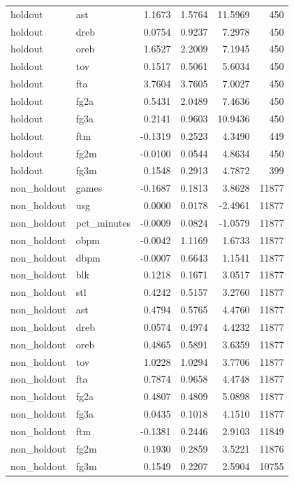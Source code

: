 \begin{table}
\begin{tabular}{llrrrr}
holdout & ast & 1.1673 & 1.5764 & 11.5969 & 450 \\
holdout & dreb & 0.0754 & 0.9237 & 7.2978 & 450 \\
holdout & oreb & 1.6527 & 2.2009 & 7.1945 & 450 \\
holdout & tov & 0.1517 & 0.5061 & 5.6034 & 450 \\
holdout & fta & 3.7604 & 3.7605 & 7.0027 & 450 \\
holdout & fg2a & 0.5431 & 2.0489 & 7.4636 & 450 \\
holdout & fg3a & 0.2141 & 0.9603 & 10.9436 & 450 \\
holdout & ftm & -0.1319 & 0.2523 & 4.3490 & 449 \\
holdout & fg2m & -0.0100 & 0.0544 & 4.8634 & 450 \\
holdout & fg3m & 0.1548 & 0.2913 & 4.7872 & 399 \\
non\_holdout & games & -0.1687 & 0.1813 & 3.8628 & 11877 \\
non\_holdout & usg & 0.0000 & 0.0178 & -2.4961 & 11877 \\
non\_holdout & pct\_minutes & -0.0009 & 0.0824 & -1.0579 & 11877 \\
non\_holdout & obpm & -0.0042 & 1.1169 & 1.6733 & 11877 \\
non\_holdout & dbpm & -0.0007 & 0.6643 & 1.1541 & 11877 \\
non\_holdout & blk & 0.1218 & 0.1671 & 3.0517 & 11877 \\
non\_holdout & stl & 0.4242 & 0.5157 & 3.2760 & 11877 \\
non\_holdout & ast & 0.4794 & 0.5765 & 4.4760 & 11877 \\
non\_holdout & dreb & 0.0574 & 0.4974 & 4.4232 & 11877 \\
non\_holdout & oreb & 0.4865 & 0.5891 & 3.6359 & 11877 \\
non\_holdout & tov & 1.0228 & 1.0294 & 3.7706 & 11877 \\
non\_holdout & fta & 0.7874 & 0.9658 & 4.4748 & 11877 \\
non\_holdout & fg2a & 0.4807 & 0.4809 & 5.0898 & 11877 \\
non\_holdout & fg3a & 0.0435 & 0.1018 & 4.1510 & 11877 \\
non\_holdout & ftm & -0.1381 & 0.2446 & 2.9103 & 11849 \\
non\_holdout & fg2m & 0.1930 & 0.2859 & 3.5221 & 11876 \\
non\_holdout & fg3m & 0.1549 & 0.2207 & 2.5904 & 10755 \\
\bottomrule
\end{tabular}
\end{table}
